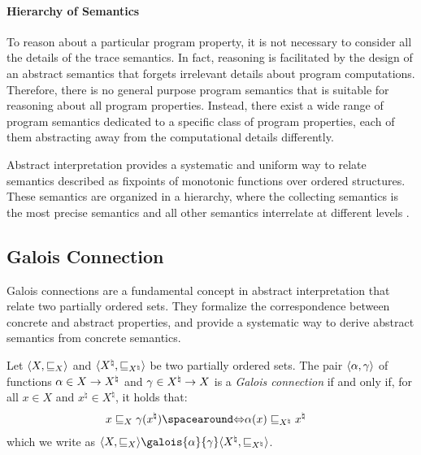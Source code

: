 \paragraph{Hierarchy of Semantics}

To reason about a particular program property, it is not necessary to consider all the details of the trace semantics.
In fact, reasoning is facilitated by the design of an abstract semantics that forgets irrelevant details about program computations.
Therefore, there is no general purpose program semantics that is suitable for reasoning about all program properties.
Instead, there exist a wide range of program semantics dedicated to a specific class of program properties, each of them abstracting away from the computational details differently.

Abstract interpretation provides a systematic and uniform way to relate semantics described as fixpoints of monotonic functions over ordered structures.
These semantics are organized in a hierarchy, where the collecting semantics is the most precise semantics and all other semantics interrelate at different levels .



\subsection{Galois Connection}

Galois connections are a fundamental concept in abstract interpretation that relate two partially ordered sets.
They formalize the correspondence between concrete and abstract properties, and provide a systematic way to derive abstract semantics from concrete semantics.

\begin{definition}
  Let $\langle X, \sqsubseteq_X \rangle$ and $\langle {X^\natural}, \sqsubseteq_{X^\natural} \rangle$ be two partially ordered sets.
  The pair $\langle \alpha, \gamma \rangle$ of functions $\alpha\in X \to {X^\natural}$ and $\gamma\in {X^\natural} \to X$ is a \emph{Galois connection} if and only if, for all $x\in X$ and ${x^\natural}\in {X^\natural}$, it holds that:
  \begin{align*}
    x \sqsubseteq_X \concretization({x^\natural}) &\IfF \abstraction(x) \sqsubseteq_{X^\natural} {x^\natural}
  \end{align*}
  which we write as $\tuple{X}{\sqsubseteq_X}\galois{\abstraction}{\concretization}\tuple{{X^\natural}}{\sqsubseteq_{X^\natural}}$.
\end{definition}

